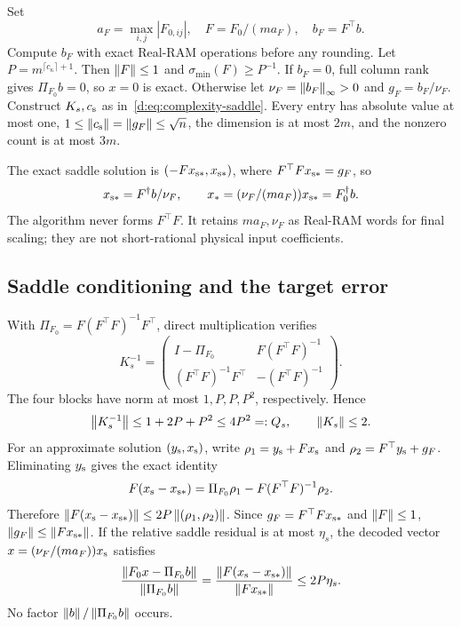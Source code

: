 Set
\begin{equation}
 a_F=\max_{i,j}|F_{0,ij}|,\quad F=F_0/(ma_F),\quad b_F=F^\top b.
\end{equation}
Compute $b_F$ with exact Real-RAM operations before any rounding. Let
$P=m^{\lceil c_\kappa\rceil+1}$. Then
$\left\lVert F\right\rVert\le1$ and $\sigma_{\min}(F)\ge P^{-1}$.
If $b_F=0$, full column rank gives $\Pi_{F_0}b=0$, so $x=0$ is exact.
Otherwise let $\nu_F=\left\lVert b_F\right\rVert_\infty>0$ and $g_F=b_F/\nu_F$.
Construct $K_s,c_{\rm s}$ as in~\eqref{d:eq:complexity-saddle}.
Every entry has absolute value at most one,
$1\le\left\lVert c_{\rm s}\right\rVert=\left\lVert g_F\right\rVert\le\sqrt n$, the dimension is at most $2m$,
and the nonzero count is at most $3m$.

The exact saddle solution is
$(-Fx_{\rm s*},x_{\rm s*})$, where $F^\top Fx_{\rm s*}=g_F$, so
\begin{equation}
 x_{\rm s*}=F^\dagger b/\nu_F,
 \qquad x_*=(\nu_F/(ma_F))x_{\rm s*}=F_0^\dagger b.
 \label{d:eq:app-saddle-exact}
\end{equation}
The algorithm never forms $F^\top F$. It retains $ma_F,\nu_F$ as Real-RAM
words for final scaling; they are not short-rational physical input
coefficients.

\subsection{Saddle conditioning and the target error}

With $\Pi_{F_0}=F(F^\top F)^{-1}F^\top$, direct multiplication verifies
\begin{equation}
 K_s^{-1}=
 \begin{pmatrix}
 I-\Pi_{F_0}&F(F^\top F)^{-1}\\
 (F^\top F)^{-1}F^\top&-(F^\top F)^{-1}
 \end{pmatrix}.
 \label{d:eq:app-saddle-inverse}
\end{equation}
The four blocks have norm at most $1,P,P,P^2$, respectively. Hence
\begin{equation}
 \left\lVert K_s^{-1}\right\rVert\le1+2P+P^2\le4P^2=:Q_s,
 \qquad \left\lVert K_s\right\rVert\le2.
 \label{d:eq:app-saddle-bounds}
\end{equation}
For an approximate solution $(y_{\rm s},x_{\rm s})$, write
$\rho_1=y_{\rm s}+Fx_{\rm s}$ and $\rho_2=F^\top y_{\rm s}+g_F$. Eliminating $y_{\rm s}$ gives the exact
identity
\begin{equation}
 F(x_{\rm s}-x_{\rm s*})=\Pi_{F_0}\rho_1-F(F^\top F)^{-1}\rho_2.
 \label{d:eq:app-saddle-residual-identity}
\end{equation}
Therefore $\left\lVert F(x_{\rm s}-x_{\rm s*})\right\rVert\le2P\left\lVert (\rho_1,\rho_2)\right\rVert$.
Since $g_F=F^\top Fx_{\rm s*}$ and $\left\lVert F\right\rVert\le1$,
$\left\lVert g_F\right\rVert\le\left\lVert Fx_{\rm s*}\right\rVert$. If the relative saddle residual is at
most $\eta_s$, the decoded vector $x=(\nu_F/(ma_F))x_{\rm s}$ satisfies
\begin{equation}
 \frac{\left\lVert F_0x-\Pi_{F_0}b\right\rVert}{\left\lVert \Pi_{F_0}b\right\rVert}
 =\frac{\left\lVert F(x_{\rm s}-x_{\rm s*})\right\rVert}{\left\lVert Fx_{\rm s*}\right\rVert}
 \le2P\eta_s.
 \label{d:eq:app-projection-relative}
\end{equation}
No factor $\left\lVert b\right\rVert/\left\lVert \Pi_{F_0}b\right\rVert$ occurs.

